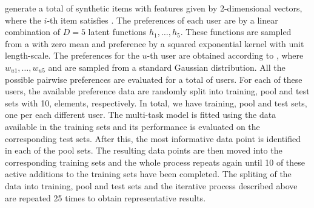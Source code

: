\DIFaddend generate a total of \DIFdelbegin {}\DIFdelend \DIFaddbegin {}\DIFaddend synthetic items with features given by 2-dimensional vectors,
where the $i$-th item satisfies
\DIFdelbegin {}\DIFdelend \DIFaddbegin {}\DIFaddend .
The preferences of each user are \DIFdelbegin {}\DIFdelend \DIFaddbegin {}\DIFaddend by a linear combination of $D=5$ latent functions $h_1,\ldots,h_5$. These functions are sampled from a \DIFdelbegin {}\DIFdelend \DIFaddbegin {}\DIFaddend with zero mean and preference \DIFdelbegin {}\DIFdelend \DIFaddbegin {}\DIFaddend by a squared exponential kernel with unit length-scale.
The preferences for the $u$-th user are obtained according to 
\DIFdelbegin {}\DIFdelend \DIFaddbegin {}\DIFaddend ,
where $w_{u1},\ldots,w_{u5}$ and \DIFdelbegin {}\DIFdelend \DIFaddbegin {}\DIFaddend are sampled from a standard Gaussian distribution.
All the possible pairwise preferences are evaluated for a total of \DIFdelbegin {}\DIFdelend \DIFaddbegin {}\DIFaddend users. 
For each of these users, the available preference data are randomly split into training, pool and test sets with 10, \DIFdelbegin {}\DIFdelend \DIFaddbegin {}\DIFaddend elements, respectively.
In total, we have \DIFdelbegin {}\DIFdelend \DIFaddbegin {}\DIFaddend training, pool and test sets, one per each different user.
The multi-task model is fitted using the data available in the \DIFdelbegin {}\DIFdelend \DIFaddbegin {}\DIFaddend training sets and its performance is
evaluated on the corresponding test sets. After this, the most informative data point is identified in each of the \DIFdelbegin {}\DIFdelend \DIFaddbegin {}\DIFaddend pool sets.
The resulting \DIFdelbegin {}\DIFdelend \DIFaddbegin {}\DIFaddend data points are then moved into the corresponding training sets and the whole process repeats
again until 10 of these active additions to the training sets have been completed.
The spliting of the data into training, pool and test sets and the iterative process described
above are repeated 25 times to obtain representative results.
\DIFdelbegin %

